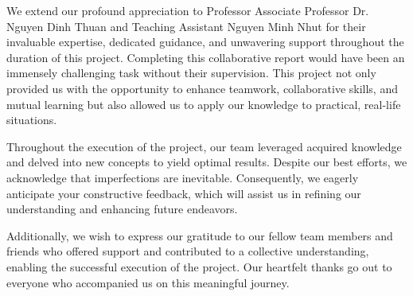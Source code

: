 \documentclass{ieeeojies}
\begin{document}
\hspace{0.3cm}We extend our profound appreciation to Professor Associate Professor Dr. Nguyen Dinh Thuan and Teaching Assistant Nguyen Minh Nhut for their invaluable expertise, dedicated guidance, and unwavering support throughout the duration of this project. Completing this collaborative report would have been an immensely challenging task without their supervision. This project not only provided us with the opportunity to enhance teamwork, collaborative skills, and mutual learning but also allowed us to apply our knowledge to practical, real-life situations.

Throughout the execution of the project, our team leveraged acquired knowledge and delved into new concepts to yield optimal results. Despite our best efforts, we acknowledge that imperfections are inevitable. Consequently, we eagerly anticipate your constructive feedback, which will assist us in refining our understanding and enhancing future endeavors.

Additionally, we wish to express our gratitude to our fellow team members and friends who offered support and contributed to a collective understanding, enabling the successful execution of the project. Our heartfelt thanks go out to everyone who accompanied us on this meaningful journey.
\end{document}
